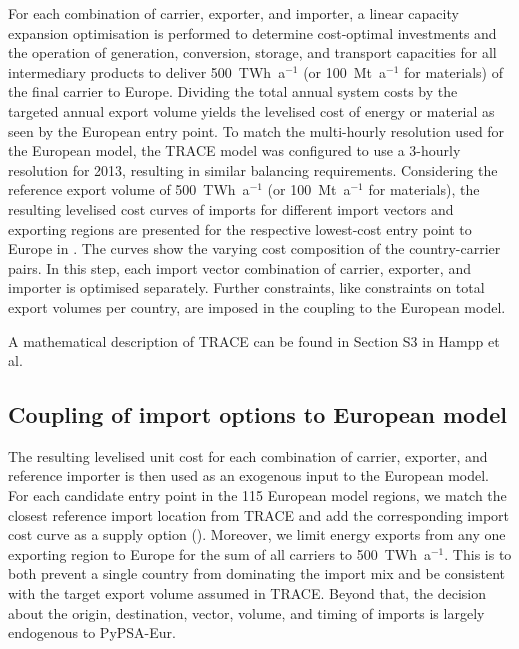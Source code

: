 
For each combination of carrier, exporter, and importer, a linear capacity
expansion optimisation is performed to determine cost-optimal investments and
the operation of generation, conversion, storage, and transport capacities for
all intermediary products to deliver 500~TWh~a$^{-1}$ (or 100~Mt~a$^{-1}$ for
materials) of the final carrier to Europe. Dividing the total annual system
costs by the targeted annual export volume yields the levelised cost of energy
or material as seen by the European entry point. To match the multi-hourly
resolution used for the European model, the TRACE model was configured to use a
3-hourly resolution for 2013, resulting in similar balancing requirements.
Considering the reference export volume of 500~TWh~a$^{-1}$ (or 100~Mt~a$^{-1}$
for materials), the resulting levelised cost curves of imports for different
import vectors and exporting regions are presented for the respective
lowest-cost entry point to Europe in
.
The curves show the varying cost composition of the country-carrier pairs. In
this step, each import vector combination of carrier, exporter, and importer is
optimised separately. Further constraints, like constraints on total export
volumes per country, are imposed in the coupling to the European model.

A mathematical description of TRACE can be found in Section S3 in Hampp et
al.\cite{hamppImportOptions2023}

\subsection*{Coupling of import options to European model}
\label{sec:methods-coupling}

The resulting levelised unit cost for each combination of carrier, exporter, and
reference importer is then used as an exogenous input to the European model. For
each candidate entry point in the 115 European model regions, we match the
closest reference import location from TRACE and add the corresponding import
cost curve as a supply option
().
Moreover, we limit energy exports from any one exporting region to Europe for
the sum of all carriers to 500~TWh~a$^{-1}$. This is to both prevent a single
country from dominating the import mix and be consistent with the target export
volume assumed in TRACE. Beyond that, the decision about the origin,
destination, vector, volume, and timing of imports is largely endogenous to
PyPSA-Eur.

